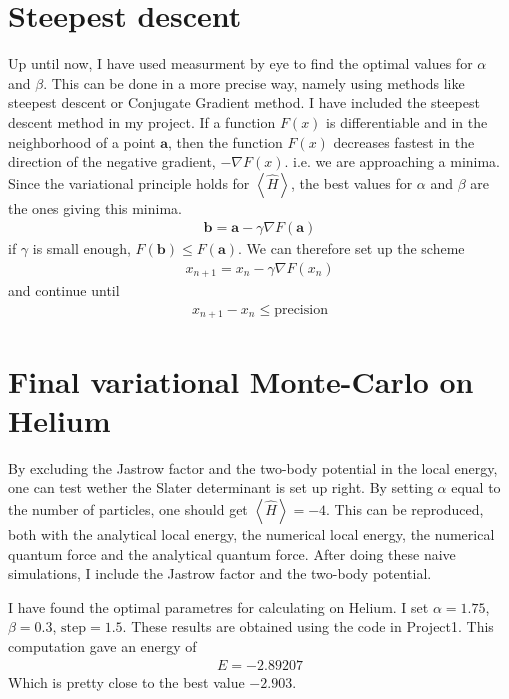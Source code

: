 \documentclass[a4paper, 12pt, titlepage]{article}
\begin{document}
\section*{Steepest descent}
 Up until now, I have used measurment by eye to find the optimal values for $\alpha$ and $\beta$. This can be done in a more precise way, namely using methods like steepest descent or Conjugate Gradient method. I have included the steepest descent method in my project.
 If a function $F(x)$ is differentiable and in the neighborhood of a point $\mathbf{a}$, then the function $F(x)$ decreases fastest in the direction of the negative gradient, $-\nabla F(x)$. i.e. we are approaching a minima. Since the variational principle holds for $\left<\hat H\right> $, the best values for $\alpha$ and $\beta$ are the ones giving this minima. 
 \begin{align*}
 	\mathbf{b} = \mathbf{a} - \gamma \nabla F(\mathbf{a}) 
 \end{align*}
 if $\gamma$ is small enough, $F(\mathbf{b}) \leq F(\mathbf{a})$. We can therefore set up the scheme
 \begin{align*}
 	x_{n+1} = x_n - \gamma \nabla F(x_n)
 \end{align*}
 and continue until
 \begin{align*}
 	x_{n+1} - x_n \leq \text{precision}
 \end{align*}

\section*{Final variational Monte-Carlo on Helium}
 By excluding the Jastrow factor and the two-body potential in the local energy, one can test wether the Slater determinant is set up right. By setting $\alpha$ equal to the number of particles, one should get $\left< \hat H \right> = -4$. This can be reproduced, both with the analytical local energy, the numerical local energy, the numerical quantum force and the analytical quantum force. After doing these naive simulations, I include the Jastrow factor and the two-body potential. 

 I have found the optimal parametres for calculating on Helium. I set $\alpha = 1.75$, $\beta = 0.3$, $\text{step} = 1.5$. These results are obtained using the code in Project1. This computation gave an energy of
 \begin{align*}
 	E = -2.89207
 \end{align*}
 Which is pretty close to the best value $-2.903$. 
\end{document}
